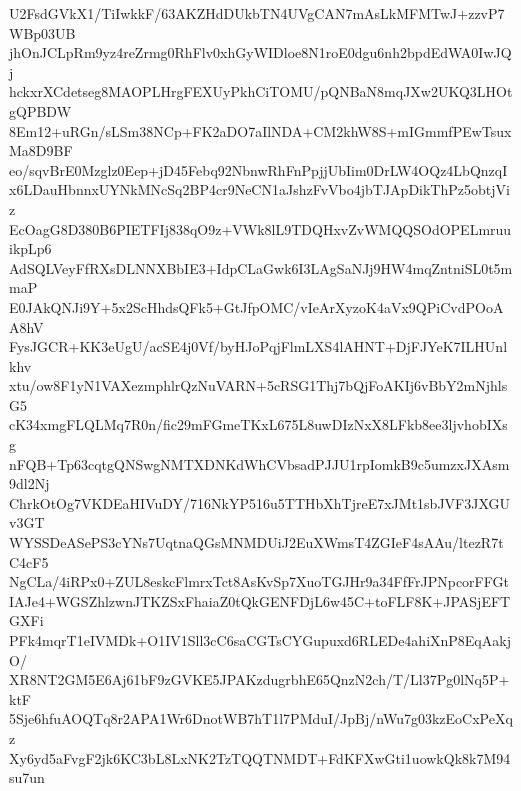 U2FsdGVkX1/TiIwkkF/63AKZHdDUkbTN4UVgCAN7mAsLkMFMTwJ+zzvP7WBp03UB
jhOnJCLpRm9yz4reZrmg0RhFlv0xhGyWIDloe8N1roE0dgu6nh2bpdEdWA0IwJQj
hckxrXCdetseg8MAOPLHrgFEXUyPkhCiTOMU/pQNBaN8mqJXw2UKQ3LHOtgQPBDW
8Em12+uRGn/sLSm38NCp+FK2aDO7aIlNDA+CM2khW8S+mIGmmfPEwTsuxMa8D9BF
eo/sqvBrE0Mzglz0Eep+jD45Febq92NbnwRhFnPpjjUbIim0DrLW4OQz4LbQnzqI
x6LDauHbnnxUYNkMNcSq2BP4cr9NeCN1aJshzFvVbo4jbTJApDikThPz5obtjViz
EcOagG8D380B6PIETFIj838qO9z+VWk8lL9TDQHxvZvWMQQSOdOPELmruuikpLp6
AdSQLVeyFfRXsDLNNXBbIE3+IdpCLaGwk6I3LAgSaNJj9HW4mqZntniSL0t5mmaP
E0JAkQNJi9Y+5x2ScHhdsQFk5+GtJfpOMC/vIeArXyzoK4aVx9QPiCvdPOoAA8hV
FysJGCR+KK3eUgU/acSE4j0Vf/byHJoPqjFlmLXS4lAHNT+DjFJYeK7ILHUnlkhv
xtu/ow8F1yN1VAXezmphlrQzNuVARN+5cRSG1Thj7bQjFoAKIj6vBbY2mNjhlsG5
cK34xmgFLQLMq7R0n/fic29mFGmeTKxL675L8uwDIzNxX8LFkb8ee3ljvhobIXsg
nFQB+Tp63cqtgQNSwgNMTXDNKdWhCVbsadPJJU1rpIomkB9c5umzxJXAsm9dl2Nj
ChrkOtOg7VKDEaHIVuDY/716NkYP516u5TTHbXhTjreE7xJMt1sbJVF3JXGUv3GT
WYSSDeASePS3cYNs7UqtnaQGsMNMDUiJ2EuXWmsT4ZGIeF4sAAu/ltezR7tC4cF5
NgCLa/4iRPx0+ZUL8eskcFlmrxTct8AsKvSp7XuoTGJHr9a34FfFrJPNpcorFFGt
IAJe4+WGSZhlzwnJTKZSxFhaiaZ0tQkGENFDjL6w45C+toFLF8K+JPASjEFTGXFi
PFk4mqrT1eIVMDk+O1IV1Sll3cC6saCGTsCYGupuxd6RLEDe4ahiXnP8EqAakjO/
XR8NT2GM5E6Aj61bF9zGVKE5JPAKzdugrbhE65QnzN2ch/T/Ll37Pg0lNq5P+ktF
5Sje6hfuAOQTq8r2APA1Wr6DnotWB7hT1l7PMduI/JpBj/nWu7g03kzEoCxPeXqz
Xy6yd5aFvgF2jk6KC3bL8LxNK2TzTQQTNMDT+FdKFXwGti1uowkQk8k7M94su7un
